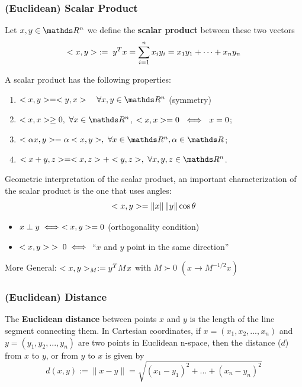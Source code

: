 \documentclass[computationalMathematics.tex]{subfiles}
\begin{document}


\subsubsection{(Euclidean) Scalar Product}

\begin{definition}
  Let $x, y \in \R^n$ we define the \textbf{scalar product} between these two vectors 
  \[
<x, y> \; := \; y^T x = \sum_{i=1}^n x_i y_i = x_1 y_1 + \cdots + x_n y_n
  \]
\end{definition}

\begin{proposition}
A scalar product has the following properties:
\begin{enumerate}
  \item $\ps{x}{y} = \ps{y}{x} \quad \forall x, y \in \R^n$ (symmetry)
  \item $\ps{x}{x} \ge 0,~\forall x \in \R^n$, $<x, x>=0~\iff~x=0$;
  \item $\ps{\alpha x}{y} = \alpha \ps{x}{y},~\forall x\in\R^n, \alpha \in \R$;
  \item $\ps{x + y}{z} = \ps{x}{z} + \ps{y}{z},~\forall x,y, z \in \R^n$.
\end{enumerate}
\end{proposition}

Geometric interpretation of the scalar product, an important characterization of the scalar product is the one that uses angles:
$$<x, y> = \left\lVert x\right\rVert \left\lVert y\right\rVert \cos \theta$$ 
\begin{itemize}
    \item $x \perp y \iff <x, y> = 0$ (orthogonality condition)
    \item $<x, y> \; >\;  0 \iff$ ``$x$ and $y$ point in the same direction''
\end{itemize}

\noindent More General: $ <x, y>_M := y^TMx $ with $M \succ 0$  $( x \longrightarrow M^{-1/2}x)$

\subsubsection{(Euclidean) Distance}
\begin{definition}
The \textbf{Euclidean distance} between points $x$ and $y$ is the length of the line segment connecting them. In Cartesian coordinates, if $x = (x_{1}, x_{2},..., x_{n})$ and $y = (y_{1}, y_{2},..., y_{n})$ are two points in Euclidean n-space, then the distance ($d$) from $x$ to $y$, or from $y$ to $x$ is given by
  \[
    d(x,y) := \lVert x - y \rVert = \sqrt{(x_{1} - y_{1})^{2} + ... + (x_{n} - y_{n})^{2}} 
  \]
  
\end{definition}
 
\end{document}
